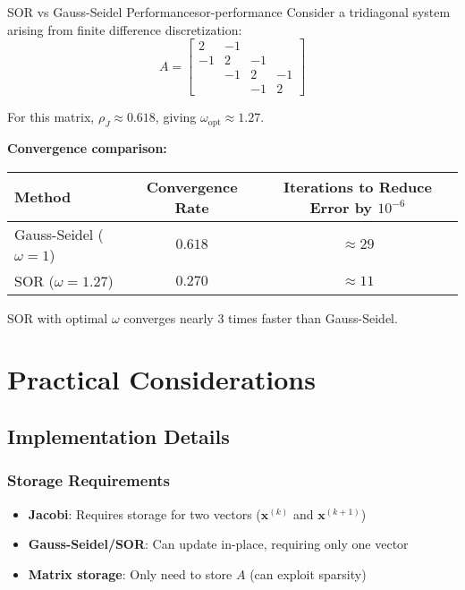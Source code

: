 \begin{example}{SOR vs Gauss-Seidel Performance}{sor-performance}
    Consider a tridiagonal system arising from finite difference discretization:
    \begin{equation*}
        A = \begin{bmatrix}
            2 & -1 & & \\
            -1 & 2 & -1 & \\
            & -1 & 2 & -1 \\
            & & -1 & 2
        \end{bmatrix}
    \end{equation*}

    For this matrix, $\rho_J \approx 0.618$, giving $\omega_{\text{opt}} \approx 1.27$.

    \textbf{Convergence comparison:}
    \begin{center}
    \begin{tabular}{l|c|c}
        Method & Convergence Rate & Iterations to Reduce Error by $10^{-6}$ \\
        \hline
        Gauss-Seidel ($\omega = 1$) & $0.618$ & $\approx 29$ \\
        SOR ($\omega = 1.27$) & $0.270$ & $\approx 11$ \\
    \end{tabular}
    \end{center}

    SOR with optimal $\omega$ converges nearly 3 times faster than Gauss-Seidel.
\end{example}

\section{Practical Considerations}

\subsection{Implementation Details}

\subsubsection{Storage Requirements}
\begin{itemize}
    \item \textbf{Jacobi}: Requires storage for two vectors ($\mathbf{x}^{(k)}$ and $\mathbf{x}^{(k+1)}$)
    \item \textbf{Gauss-Seidel/SOR}: Can update in-place, requiring only one vector
    \item \textbf{Matrix storage}: Only need to store $A$ (can exploit sparsity)
\end{itemize}


